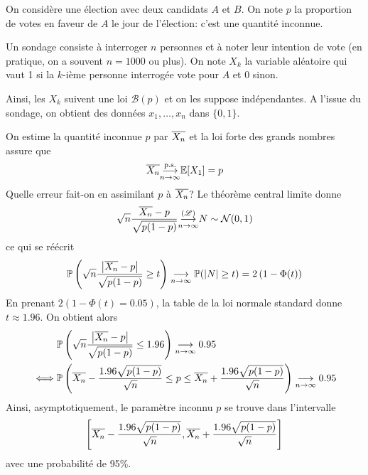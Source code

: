 \begin{example}
    On considère une élection avec deux candidats \(A\) et \(B\).
    On note \(p\) la proportion de votes en faveur de \(A\) le
    jour de l'élection: c'est une quantité inconnue. 

    Un sondage consiste à interroger \(n\) personnes et à
    noter leur intention de vote (en pratique, on a souvent
    \(n=1000\) ou plus). On note \(X_k\) la variable aléatoire
    qui vaut 1 si la \(k\)-ième personne interrogée vote pour \(A\)
    et 0 sinon. 
    
    Ainsi, les \(X_k\) suivent une loi \(\mathcal B(p)\)
    et on les suppose indépendantes.
    A l'issue du sondage, on obtient des données \(x_1,\ldots,x_n\)
    dans \(\{0,1\}\).

    On estime la quantité inconnue \(p\) par \(\overline{X_n}\)
    et la loi forte des grands nombres assure que
    \begin{equation*}
        \overline{X_n} \underset{n\to\infty}{{\overset{\text{p.s.}}{\longrightarrow}}} \mathbb{E}[X_1] = p
    \end{equation*}
    Quelle erreur fait-on en assimilant \(p\) à \(\overline{X_n}\)?
    Le théorème central limite donne
    \begin{equation*}
        \sqrt{n}\frac{\overline{X_n}-p}{\sqrt{p(1-p)}} \underset{n\to\infty}{{\overset{(\mathscr{L})}{\longrightarrow}}} N \sim \mathcal N(0,1)
    \end{equation*}
    ce qui se réécrit
    \begin{equation*}
        \mathbb{P}\left(\sqrt{n}\frac{\mathopen{}\left|\overline{X_n}-p\right|\mathclose{}}{\sqrt{p(1-p)}}\geq t\right) \underset{n\to\infty}{\longrightarrow} \mathbb{P}(\mathopen{}\left|N\right|\mathclose{}\geq t)=2\left(1-\Phi(t)\right)
    \end{equation*}
    En prenant \(2\left(1-\Phi(t)=0.05\right)\), la table de la loi normale
    standard donne \(t\approx 1.96\). On obtient alors
    \begin{equation*}
        \begin{aligned}
            &\mathbb{P}\left(\sqrt{n}\frac{\mathopen{}\left|\overline{X_n}-p\right|\mathclose{}}{\sqrt{p(1-p)}}\leq 1.96\right) \underset{n\to\infty}{\longrightarrow} 0.95\\
            \iff &\mathbb{P}\left(\overline{X_n}-\frac{1.96\sqrt{p(1-p)}}{\sqrt{n}}\leq p \leq \overline{X_n}+\frac{1.96\sqrt{p(1-p)}}{\sqrt{n}}\right) \underset{n\to\infty}{\longrightarrow} 0.95
        \end{aligned}
    \end{equation*}
    Ainsi, asymptotiquement, le paramètre inconnu \(p\) se trouve
    dans l'intervalle
    \begin{equation*}
        \mathopen{}\left[\overline{X_n}-\frac{1.96\sqrt{p(1-p)}}{\sqrt{n}},\overline{X_n}+\frac{1.96\sqrt{p(1-p)}}{\sqrt{n}}\right]\mathclose{}
    \end{equation*}
    avec une probabilité de 95\%.


\end{example}
